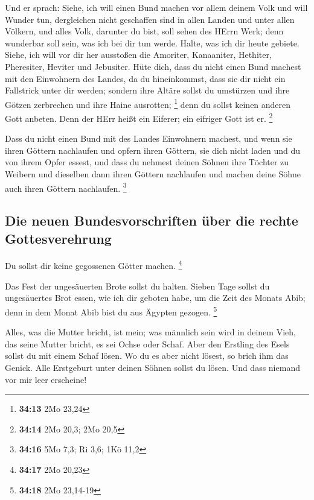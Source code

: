  Und er sprach: Siehe, ich will einen Bund machen vor
allem deinem Volk und will Wunder tun, dergleichen nicht geschaffen sind
in allen Landen und unter allen Völkern, und alles Volk, darunter du
bist, soll sehen des HErrn Werk; denn wunderbar soll sein, was ich bei
dir tun werde.  Halte, was ich dir heute gebiete. Siehe,
ich will vor dir her ausstoßen die Amoriter, Kanaaniter, Hethiter,
Pheresiter, Heviter und Jebusiter.  Hüte dich, dass du
nicht einen Bund machest mit den Einwohnern des Landes, da du
hineinkommst, dass sie dir nicht ein Fallstrick unter dir werden;
 sondern ihre Altäre sollst du umstürzen und ihre Götzen
zerbrechen und ihre Haine ausrotten; \footnote{\textbf{34:13} 2Mo 23,24}
 denn du sollst keinen anderen Gott anbeten. Denn der
HErr heißt ein Eiferer; ein eifriger Gott ist er. \footnote{\textbf{34:14}
  2Mo 20,3; 2Mo 20,5}

 Dass du nicht einen Bund mit des Landes Einwohnern
machest, und wenn sie ihren Göttern nachlaufen und opfern ihren Göttern,
sie dich nicht laden und du von ihrem Opfer essest,  und
dass du nehmest deinen Söhnen ihre Töchter zu Weibern und dieselben dann
ihren Göttern nachlaufen und machen deine Söhne auch ihren Göttern
nachlaufen. \footnote{\textbf{34:16} 5Mo 7,3; Ri 3,6; 1Kö 11,2}

\hypertarget{die-neuen-bundesvorschriften-uxfcber-die-rechte-gottesverehrung}{%
\subsection{Die neuen Bundesvorschriften über die rechte
Gottesverehrung}\label{die-neuen-bundesvorschriften-uxfcber-die-rechte-gottesverehrung}}

 Du sollst dir keine gegossenen Götter machen.
\footnote{\textbf{34:17} 2Mo 20,23}

 Das Fest der ungesäuerten Brote sollst du halten. Sieben
Tage sollst du ungesäuertes Brot essen, wie ich dir geboten habe, um die
Zeit des Monats Abib; denn in dem Monat Abib bist du aus Ägypten
gezogen. \footnote{\textbf{34:18} 2Mo 23,14-19}

 Alles, was die Mutter bricht, ist mein; was männlich
sein wird in deinem Vieh, das seine Mutter bricht, es sei Ochse oder
Schaf.  Aber den Erstling des Esels sollst du mit einem
Schaf lösen. Wo du es aber nicht lösest, so brich ihm das Genick. Alle
Erstgeburt unter deinen Söhnen sollst du lösen. Und dass niemand vor mir
leer erscheine!

